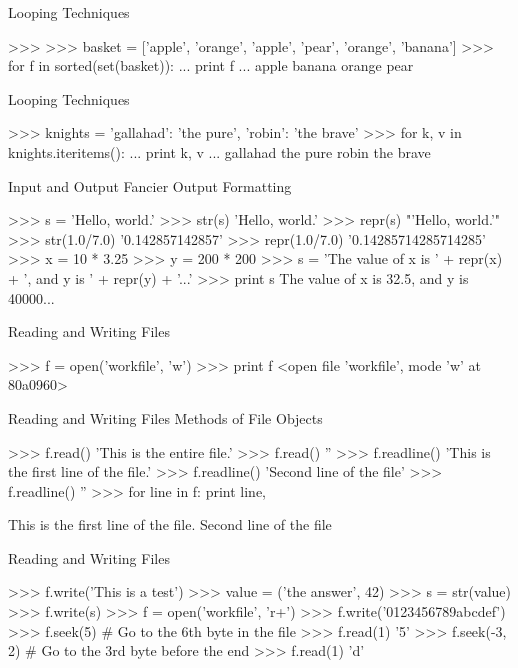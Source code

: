 \documentclass[11pt]{beamer}
\begin{document}
\begin{frame}[containsverbatim]{Looping Techniques}
\begin{python}
>>>
>>> basket = ['apple', 'orange', 'apple', 'pear', 'orange', 'banana']
>>> for f in sorted(set(basket)):
...    print f
...
apple
banana
orange
pear
\end{python}
\end{frame}

\begin{frame}[containsverbatim]{Looping Techniques}
\begin{python}
>>> knights = {'gallahad': 'the pure', 'robin': 'the brave'}
>>> for k, v in knights.iteritems():
...    print k, v
...
gallahad the pure
robin the brave
\end{python}
\end{frame}

\begin{frame}[containsverbatim]{Input and Output}
Fancier Output Formatting
\begin{python}
>>> s = 'Hello, world.'
>>> str(s)
'Hello, world.'
>>> repr(s)
"'Hello, world.'"
>>> str(1.0/7.0)
'0.142857142857'
>>> repr(1.0/7.0)
'0.14285714285714285'
>>> x = 10 * 3.25
>>> y = 200 * 200
>>> s = 'The value of x is ' + repr(x) + ', and y is ' + repr(y) + '...'
>>> print s
The value of x is 32.5, and y is 40000...

\end{python}
\end{frame}

\begin{frame}[containsverbatim]{Reading and Writing Files}
\begin{python}
>>> f = open('workfile', 'w')
>>> print f
<open file 'workfile', mode 'w' at 80a0960>
\end{python}
\end{frame}

\begin{frame}[containsverbatim]{Reading and Writing Files}
Methods of File Objects
\begin{python}
>>> f.read()
'This is the entire file.\n'
>>> f.read()
''
>>> f.readline()
'This is the first line of the file.\n'
>>> f.readline()
'Second line of the file\n'
>>> f.readline()
''
>>> for line in f:
        print line,

This is the first line of the file.
Second line of the file
\end{python}
\end{frame}


\begin{frame}[containsverbatim]{Reading and Writing Files}
\begin{python}
>>> f.write('This is a test\n')
>>> value = ('the answer', 42)
>>> s = str(value)
>>> f.write(s)
>>> f = open('workfile', 'r+')
>>> f.write('0123456789abcdef')
>>> f.seek(5)     # Go to the 6th byte in the file
>>> f.read(1)
'5'
>>> f.seek(-3, 2) # Go to the 3rd byte before the end
>>> f.read(1)
'd'
\end{python}
\end{frame}
\end{document}
